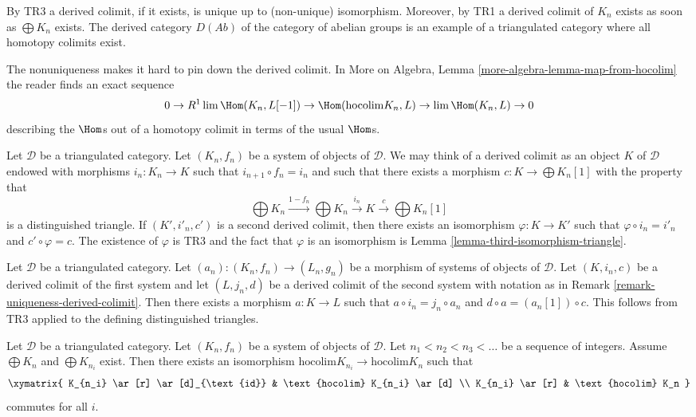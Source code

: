 \noindent
By TR3 a derived colimit, if it exists, is unique up to (non-unique)
isomorphism. Moreover, by TR1 a derived colimit of $K_n$ exists
as soon as $\bigoplus K_n$ exists. The derived category $D(\textit{Ab})$
of the category of abelian groups is an example of a triangulated
category where all homotopy colimits exist.

\medskip\noindent
The nonuniqueness makes it hard to pin down the derived colimit. In
More on Algebra, Lemma \ref{more-algebra-lemma-map-from-hocolim}
the reader finds an exact sequence
$$
0 \to R^1\lim \Hom(K_n, L[-1]) \to \Hom(\text{hocolim} K_n, L)
\to \lim \Hom(K_n, L) \to 0
$$
describing the $\Hom$s out of a homotopy colimit in terms of the
usual $\Hom$s.

\begin{remark}
\label{remark-uniqueness-derived-colimit}
Let $\mathcal{D}$ be a triangulated category.
Let $(K_n, f_n)$ be a system of objects of $\mathcal{D}$.
We may think of a derived colimit as an object $K$
of $\mathcal{D}$ endowed with morphisms $i_n : K_n \to K$
such that $i_{n + 1} \circ f_n = i_n$ and such that there
exists a morphism $c : K \to \bigoplus K_n[1]$ with the property that
$$
\bigoplus K_n \xrightarrow{1 - f_n} \bigoplus K_n \xrightarrow{i_n}
K \xrightarrow{c} \bigoplus K_n[1]
$$
is a distinguished triangle. If $(K', i'_n, c')$ is a second
derived colimit, then there exists an isomorphism
$\varphi : K \to K'$ such that $\varphi \circ i_n = i'_n$ and
$c' \circ \varphi = c$. The existence of $\varphi$ is
TR3 and the fact that $\varphi$ is an isomorphism is
Lemma \ref{lemma-third-isomorphism-triangle}.
\end{remark}

\begin{remark}
\label{remark-functoriality-derived-colimit}
Let $\mathcal{D}$ be a triangulated category.
Let $(a_n) : (K_n, f_n) \to (L_n, g_n)$ be a morphism of systems
of objects of $\mathcal{D}$. Let $(K, i_n, c)$ be a derived
colimit of the first system and let $(L, j_n, d)$ be a derived
colimit of the second system with notation as in
Remark \ref{remark-uniqueness-derived-colimit}.
Then there exists a morphism $a : K \to L$
such that $a \circ i_n = j_n \circ a_n$ and $d \circ a = (a_n[1]) \circ c$.
This follows from TR3 applied to the defining distinguished
triangles.
\end{remark}

\begin{lemma}
\label{lemma-hocolim-subsequence}
Let $\mathcal{D}$ be a triangulated category.
Let $(K_n, f_n)$ be a system of objects of $\mathcal{D}$.
Let $n_1 < n_2 < n_3 < \ldots$ be a sequence of integers.
Assume $\bigoplus K_n$ and $\bigoplus K_{n_i}$ exist.
Then there exists an isomorphism
$\text{hocolim} K_{n_i} \to \text{hocolim} K_n$
such that
$$
\xymatrix{
K_{n_i} \ar[r] \ar[d]_{\text{id}} & \text{hocolim} K_{n_i} \ar[d] \\
K_{n_i} \ar[r] & \text{hocolim} K_n
}
$$
commutes for all $i$.
\end{lemma}

